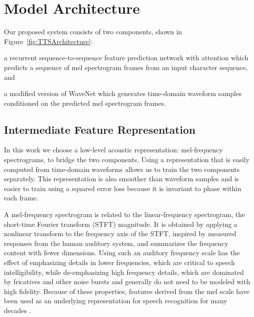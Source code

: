 \section{Model Architecture}
\label{sec:arch}

Our proposed system consists of two components, shown in Figure~\ref{fig:TTSArchitecture}:
\begin{inparaenum}[(1)]
  \item a recurrent sequence-to-sequence feature prediction network with
    attention which predicts a sequence of mel spectrogram frames from an
    input character sequence, and
  \item a modified version of WaveNet which generates time-domain waveform samples
    conditioned on the predicted mel spectrogram frames.
\end{inparaenum}

\subsection{Intermediate Feature Representation}

In this work we choose a low-level acoustic representation: mel-frequency
spectrograms, to bridge the two components. Using a representation
that is easily computed from time-domain waveforms allows us to train the two
components separately. This representation is also smoother than waveform
samples and is easier to train using a squared error loss because it is
invariant to phase within each frame.

A mel-frequency spectrogram is related to the linear-frequency spectrogram, \ie
the short-time Fourier transform (STFT) magnitude. It is obtained by applying a
nonlinear transform to the frequency axis of the STFT, inspired by measured
responses from the human auditory system, and summarizes the frequency content
with fewer dimensions.
%
Using such an auditory frequency scale has the effect of emphasizing details in
lower frequencies, which are critical to speech intelligibility, while
de-emphasizing high frequency details, which are dominated by fricatives and
other noise bursts and generally do not need to be modeled with high fidelity.
%
Because of these properties, features derived from the mel scale have
been used as an underlying representation for speech recognition for
many decades \cite{davis:mel}.

